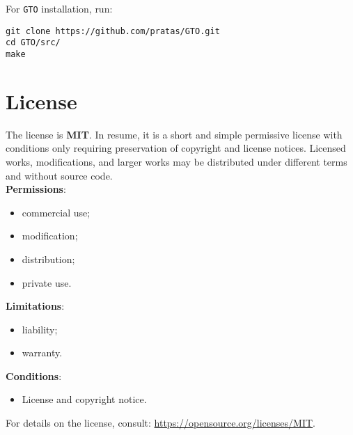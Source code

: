 For \texttt{GTO} installation, run:
\begin{lstlisting}
git clone https://github.com/pratas/GTO.git
cd GTO/src/
make
\end{lstlisting}

\section{License}

The license is \textbf{MIT}. In resume, it is a short and simple permissive license with conditions only requiring preservation of copyright and license notices. Licensed works, modifications, and larger works may be distributed under different terms and without source code.\\
\textbf{Permissions}:
\begin{itemize}
	\item commercial use;
	\item modification;
	\item distribution;
	\item private use.
\end{itemize}
\textbf{Limitations}:
\begin{itemize}
	\item liability;
	\item warranty.
\end{itemize}
\textbf{Conditions}:
\begin{itemize}
        \item License and copyright notice.
\end{itemize}
For details on the license, consult: \url{https://opensource.org/licenses/MIT}.
